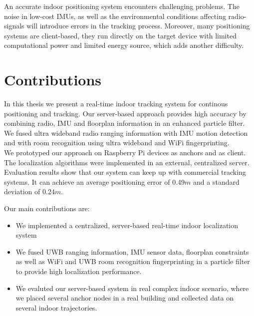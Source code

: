 \noindent\hspace*{5mm}%
An accurate indoor positioning system encounters challenging problems. The noise in low-cost IMUs, as well as the environmental conditions affecting radio-signals will introduce errors in the tracking process. Moreover, many positioning systems are client-based, they run directly on the target device with limited computational power and limited energy source, which adds another difficulty.



\section{Contributions}

In this thesis we present a real-time indoor tracking system for continous positioning and tracking. Our server-based approach provides high accuracy by combining radio, IMU and floorplan information in an enhanced particle filter. We fused ultra wideband radio ranging information with IMU motion detection and with room recognition using ultra wideband and WiFi fingerprinting. \\
\noindent\hspace*{5mm}%
We prototyped our approach on Raspberry Pi devices as anchors and as client. The localization algorithms were implemented in an external, centralized server.
Evaluation results show that our system can keep up with commercial tracking systems. It can achieve an average positioning error of 0.49$m$ and a standard deviation of 0.24$m$.

Our main contributions are:
\begin{itemize}
\item We implemented a centralized, server-based real-time indoor localization system
\item We fused UWB ranging information, IMU sensor data, floorplan constraints as well as WiFi and UWB room recognition fingerprinting in a particle filter to provide high localization performance. 
\item We evaluted our server-based system in real complex indoor scenario, where we placed several anchor nodes in a real building and collected data on several indoor trajectories. 
\end{itemize}



